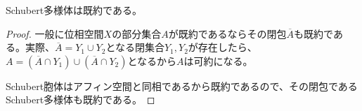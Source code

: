 \documentclass{ltjsreport}
\begin{document}
\begin{cor}
  Schubert多様体は既約である。
\end{cor}

\begin{proof}
  一般に位相空間$X$の部分集合$A$が既約であるならその閉包$\overline{A}$も既約である。実際、$\overline{A}=Y_1\cup Y_2$となる閉集合$Y_1,Y_2$が存在したら、$A=(\overline{A}\cap Y_1)\cup(\overline{A}\cap Y_2)$となるから$A$は可約になる。

  Schubert胞体はアフィン空間と同相であるから既約であるので、その閉包であるSchubert多様体も既約である。
\end{proof}
\end{document}
